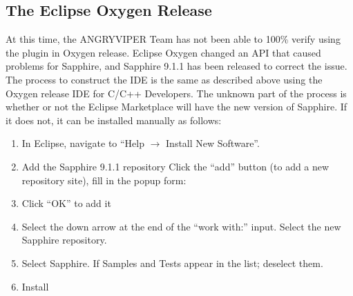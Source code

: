 \begin{appendices}
\subsection{The Eclipse Oxygen Release}
\label{subsec:eclipse_oxygen}
At this time, the ANGRYVIPER Team has not been able to 100\% verify using the plugin in Oxygen release. Eclipse Oxygen changed an API that caused problems for Sapphire, and Sapphire 9.1.1 has been released to correct the issue. \\

The process to construct the IDE is the same as described above using the Oxygen release IDE for C/C++ Developers. The unknown part of the process is whether or not the Eclipse Marketplace will have the new version of Sapphire. If it does not, it can be installed manually as follows:
\begin{enumerate}
\item In Eclipse, navigate to ``Help $\rightarrow$ Install New Software''.
\item Add the Sapphire 9.1.1 repository
\subitem Click the ``add'' button (to add a new repository site), fill in the popup form:
\subitem {}
\subitem {}
\item Click ``OK'' to add it
\item Select the down arrow at the end of the ``work with:'' input. Select the new Sapphire repository.
\item Select Sapphire. If Samples and Tests appear in the list; deselect them.
\item Install
\end{enumerate}

\end{appendices}


